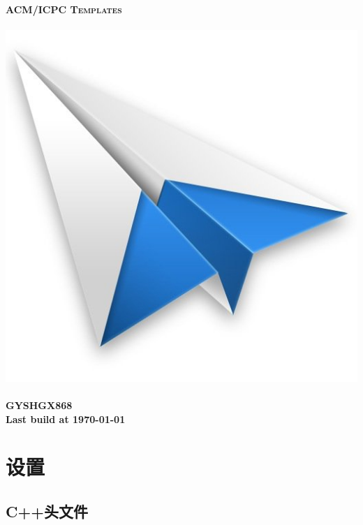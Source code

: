 \documentclass[a4paper, 12pt, twoside]{article}
\begin{document}
\pagestyle{fancy}
\fancyfoot[C]{}
\cfoot{\thepage}
\begin{titlepage}
	\pagestyle{empty}
	
  \begin{center}
		~\\[80pt]
    \fontsize{40pt}{\baselineskip}\selectfont \textsc{\textbf{ACM/ICPC Templates}}\\[32pt]
    ~\\[20pt]
    \includegraphics[scale=.7]{./Cover.jpg}
    ~\\[20pt]
    \Huge\textbf{GYSHGX868}\\[14pt]
    \Large\textbf{Last build at \today}
  \end{center}
\end{titlepage}
\restoregeometry

\setcounter{page}{1}
\tableofcontents
\clearpage
\setcounter{page}{1}

\section{设置}
\subsection{C++头文件}

\end{document}
